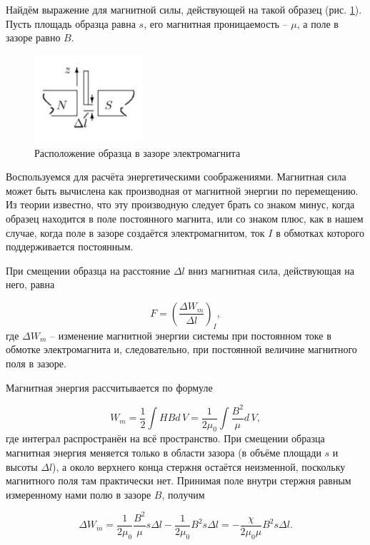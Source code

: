 \documentclass[11pt]{article}
\begin{document}
Найдём выражение для магнитной силы, действующей на такой образец (рис. \ref{pic:1}). Пусть площадь образца равна $ s $, его магнитная проницаемость -- $ \mu $, а поле в зазоре равно $ B $.

\begin{figure}
    \includegraphics[width=4cm]{Screenshot_2.jpg}
    \caption{Расположение образца в зазоре электромагнита}
    \label{pic:1}
\end{figure}

Воспользуемся для расчёта энергетическими соображениями. Магнитная сила может быть вычислена как производная от магнитной энергии по перемещению. Из теории известно, что эту производную следует брать со знаком минус, когда образец находится в поле постоянного магнита, или со знаком плюс, как в нашем случае, когда поле в зазоре создаётся электромагнитом, ток $ I $ в обмотках которого поддерживается постоянным.

При смещении образца на расстояние $ \Delta l $ вниз магнитная сила, действующая на него, равна

\begin{equation}\label{1}
F = \left(\frac{\Delta W_m}{\Delta l}\right)_I,
\end{equation}
где $ \Delta W_m $ -- изменение магнитной энергии системы при постоянном токе
в обмотке электромагнита и, следовательно, при постоянной величине
магнитного поля в зазоре.

Магнитная энергия рассчитывается по формуле

\begin{equation}\label{2}
W_m=\frac{1}{2}\int HBd\,V = \frac{1}{2\mu_0}\int\frac{B^2}{\mu}d\,V,
\end{equation}
где интеграл распространён на всё пространство. При смещении образца магнитная энергия меняется только в области зазора (в объёме площади $ s $ и высоты $ \Delta l $), а около верхнего конца стержня остаётся неизменной, поскольку магнитного поля там практически нет. Принимая поле внутри стержня равным измеренному нами полю в зазоре $ B $, получим

\begin{equation}\label{3}
\Delta W_m=\frac{1}{2\mu_0}\frac{B^2}{\mu}s\Delta l - \frac{1}{2\mu_0}B^2 s\Delta l = -\frac{\chi}{2\mu_0\mu}B^2s\Delta l.
\end{equation}
\end{document}
